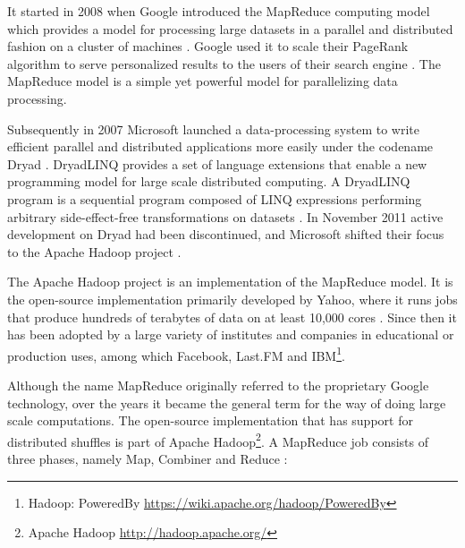 It started in 2008 when Google introduced the MapReduce computing model which provides a model for processing large datasets in a parallel and distributed fashion on a cluster of machines \cite{Dean:2008:MSD:1327452.1327492}. Google used it to scale their PageRank algorithm to serve personalized results to the users of their search engine \cite{Bahmani:2011:FPP:1989323.1989425}. The MapReduce model is a simple yet powerful model for parallelizing data processing. 

Subsequently in 2007 Microsoft launched a data-processing system to write efficient parallel and distributed applications more easily under the codename Dryad \cite{export:63785}. DryadLINQ provides a set of language extensions that enable a new programming model for large scale distributed computing. A DryadLINQ program is a sequential program composed of LINQ expressions performing arbitrary side-effect-free transformations on datasets \cite{export:70861}. In November 2011 active development on Dryad had been discontinued, and Microsoft shifted their focus to the Apache Hadoop project \cite{linqdisc}.

The Apache Hadoop project is an implementation of the MapReduce model. It is the open-source implementation primarily developed by Yahoo, where it runs jobs that produce hundreds of terabytes of data on at least 10,000 cores \cite{HadoopMapYahoo}. Since then it has been adopted by a large variety of institutes and companies in educational or production uses, among which Facebook, Last.FM and IBM\footnote{Hadoop: PoweredBy \url{https://wiki.apache.org/hadoop/PoweredBy}}.

Although the name MapReduce originally referred to the proprietary Google technology, over the years it became the general term for the way of doing large scale computations. The open-source implementation that has support for distributed shuffles is part of Apache Hadoop\footnote{Apache Hadoop \url{http://hadoop.apache.org/}}. A MapReduce job consists of three phases, namely Map, Combiner and Reduce \cite{Dean:2008:MSD:1327452.1327492}:

